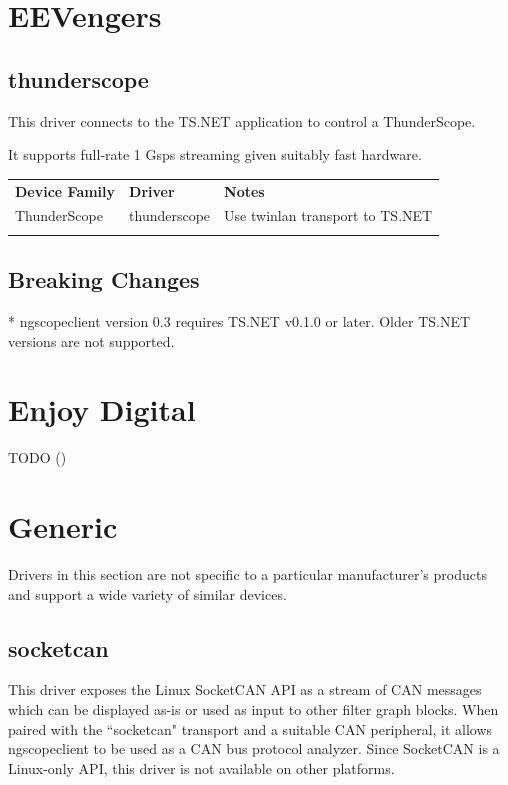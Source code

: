 \section{EEVengers}

\subsection{thunderscope}

This driver connects to the TS.NET application to control a ThunderScope.

It supports full-rate 1 Gsps streaming given suitably fast hardware.

\begin{tabularx}{16cm}{llX}
\thickhline
\textbf{Device Family} & \textbf{Driver} & \textbf{Notes} \\
\thickhline
ThunderScope & thunderscope & Use twinlan transport to TS.NET \\
\thickhline
\end{tabularx}

\subsection{Breaking Changes}

* ngscopeclient version 0.3 requires TS.NET v0.1.0 or later. Older TS.NET versions are not supported.

\section{Enjoy Digital}
TODO ()

\section{Generic}

Drivers in this section are not specific to a particular manufacturer's products and support a wide variety of similar
devices.

\subsection{socketcan}
\label{driver:socketcan}

This driver exposes the Linux SocketCAN API as a stream of CAN messages which can be displayed as-is or used as input
to other filter graph blocks. When paired with the ``socketcan" transport and a suitable CAN peripheral, it allows
ngscopeclient to be used as a CAN bus protocol analyzer. Since SocketCAN is a Linux-only API, this driver is not
available on other platforms.

